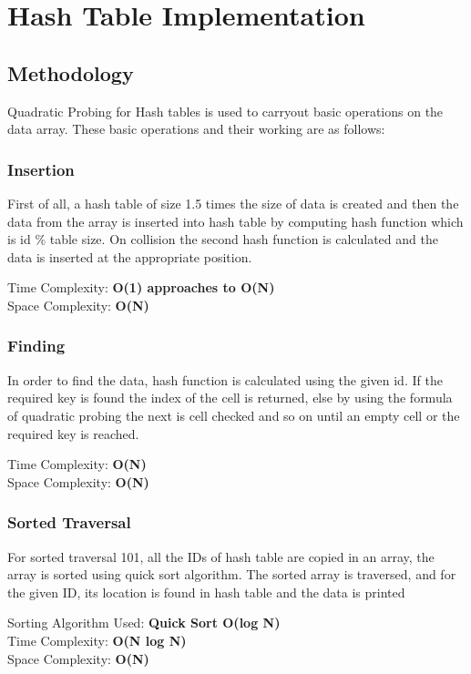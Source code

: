 \chapter{Hash Table Implementation} %
\label{Chapter3}

\section{Methodology}
Quadratic Probing for Hash tables is used to carryout basic operations on the data array. These basic operations and their working are as follows:

\subsection{Insertion}
First of all, a hash table of size 1.5 times the size of data is created and then the data from the array is inserted into hash table by computing hash function which is id \% table size. On collision the second hash function is calculated and the data is inserted at the appropriate position.

Time Complexity: \textbf{O(1) approaches to O(N)} \\
Space Complexity: \textbf{O(N)}

\subsection{Finding}
In order to find the data, hash function is calculated using the given id. If the required key is found the index of the cell is returned, else by using the formula of quadratic probing the next is cell checked and so on until an empty cell or the required key is reached.

Time Complexity: \textbf{O(N)} \\
Space Complexity: \textbf{O(N)}

\subsection{Sorted Traversal}
For sorted traversal 101, all the IDs of hash table are copied in an array, the array is sorted using quick sort algorithm. The sorted array is traversed, and for the given ID, its location is found in hash table and the data is printed

Sorting Algorithm Used: \textbf{Quick Sort O(log N)} \\
Time Complexity: \textbf{O(N log N)}\\ 
Space Complexity: \textbf{O(N)} \\

